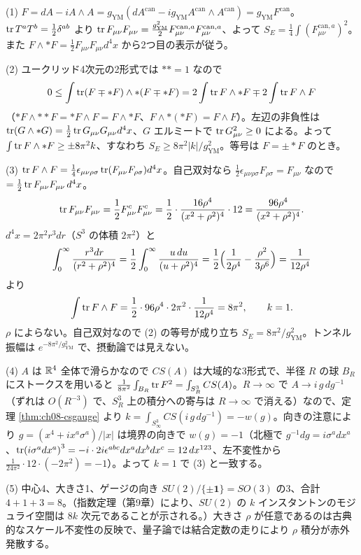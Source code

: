 \begin{solution}
(1) $F=dA-iA\wedge A=g_{\mathrm{YM}}(dA^{\mathrm{can}}-ig_{\mathrm{YM}}A^{\mathrm{can}}\wedge A^{\mathrm{can}})=g_{\mathrm{YM}}F^{\mathrm{can}}$。$\tr T^aT^b=\frac12\delta^{ab}$ より $\tr F_{\mu\nu}F_{\mu\nu}=\frac{g_{\mathrm{YM}}^2}{2}F^{\mathrm{can},a}_{\mu\nu}F^{\mathrm{can},a}_{\mu\nu}$、よって $S_E=\frac14\int(F^{\mathrm{can},a}_{\mu\nu})^2$。また $F\wedge*F=\frac12F_{\mu\nu}F_{\mu\nu}d^4x$ から2つ目の表示が従う。

(2) ユークリッド4次元の2形式では $**=1$ なので
\[
0\le\int\tr(F\mp*F)\wedge*(F\mp*F)=2\int\tr F\wedge*F\mp2\int\tr F\wedge F
\]
（$*F\wedge**F=*F\wedge F=F\wedge*F$、$F\wedge*(*F)=F\wedge F$）。左辺の非負性は $\tr(G\wedge*G)=\frac12\tr G_{\mu\nu}G_{\mu\nu}d^4x$、$G$ エルミートで $\tr G_{\mu\nu}^2\ge0$ による。よって $\int\tr F\wedge*F\ge\pm8\pi^2k$、すなわち $S_E\ge8\pi^2\lvert k\rvert/g_{\mathrm{YM}}^2$。等号は $F=\pm*F$ のとき。

(3) $\tr F\wedge F=\frac14\epsilon_{\mu\nu\rho\sigma}\tr(F_{\mu\nu}F_{\rho\sigma})d^4x$。自己双対なら $\frac12\epsilon_{\mu\nu\rho\sigma}F_{\rho\sigma}=F_{\mu\nu}$ なので $=\frac12\tr F_{\mu\nu}F_{\mu\nu}\,d^4x$。
\[
\tr F_{\mu\nu}F_{\mu\nu}=\frac12F^c_{\mu\nu}F^c_{\mu\nu}=\frac12\cdot\frac{16\rho^4}{(x^2+\rho^2)^4}\cdot12=\frac{96\rho^4}{(x^2+\rho^2)^4}.
\]
$d^4x=2\pi^2r^3dr$（$S^3$ の体積 $2\pi^2$）と
\[
\int_0^\infty\frac{r^3dr}{(r^2+\rho^2)^4}=\frac12\int_0^\infty\frac{u\,du}{(u+\rho^2)^4}=\frac12\Bigl(\frac{1}{2\rho^4}-\frac{\rho^2}{3\rho^6}\Bigr)=\frac{1}{12\rho^4}
\]
より
\[
\int\tr F\wedge F=\frac12\cdot96\rho^4\cdot2\pi^2\cdot\frac1{12\rho^4}=8\pi^2,\qquad k=1 .
\]
$\rho$ によらない。自己双対なので (2) の等号が成り立ち $S_E=8\pi^2/g_{\mathrm{YM}}^2$。トンネル振幅は $e^{-8\pi^2/g_{\mathrm{YM}}^2}$ で、摂動論では見えない。

(4) $A$ は $\mathbb{R}^4$ 全体で滑らかなので $CS(A)$ は大域的な3形式で、半径 $R$ の球 $B_R$ にストークスを用いると $\frac1{8\pi^2}\int_{B_R}\tr F^2=\int_{S^3_R}CS(A)$。$R\to\infty$ で $A\to i\,g\,dg^{-1}$（ずれは $O(R^{-3})$ で、$S^3_R$ 上の積分への寄与は $R\to\infty$ で消える）なので、定理 \ref{thm:ch08-csgauge} より $k=\int_{S^3_\infty}CS(i\,g\,dg^{-1})=-w(g)$。向きの注意により $g=(x^4+ix^a\sigma^a)/\lvert x\rvert$ は境界の向きで $w(g)=-1$（北極で $g^{-1}dg=i\sigma^adx^a$、$\tr(i\sigma^adx^a)^3=-i\cdot2i\epsilon^{abc}dx^adx^bdx^c=12\,dx^{123}$、左不変性から $\frac{1}{24\pi^2}\cdot12\cdot(-2\pi^2)=-1$）。よって $k=1$ で (3) と一致する。

(5) 中心4、大きさ1、ゲージの向き $SU(2)/\{\pm\mathbf1\}=SO(3)$ の3、合計 $4+1+3=8$。（指数定理（第9章）により、$SU(2)$ の $k$ インスタントンのモジュライ空間は $8k$ 次元であることが示される。）大きさ $\rho$ が任意であるのは古典的なスケール不変性の反映で、量子論では結合定数の走りにより $\rho$ 積分が赤外発散する。
\end{solution}

